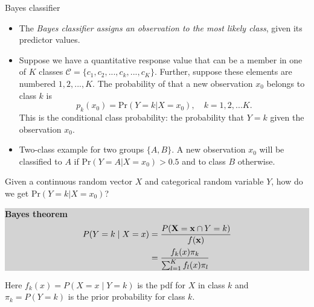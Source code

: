 \documentclass[10pt,ignorenonframetext,]{beamer}
\begin{document}
\begin{frame}

\begin{block}{Bayes classifier}

\begin{itemize}
\item
  The \emph{Bayes classifier assigns an observation to the most likely
  class}, given its predictor values.
\item
  Suppose we have a quantitative response value that can be a member in
  one of \(K\) classes
  \(\mathcal{C} = \{c_1, c_2, ..., c_k, ..., c_K\}\). Further, suppose
  these elements are numbered \(1, 2, ..., K\). The probability of that
  a new observation \(x_0\) belongs to class \(k\) is
  \[p_k(x_0) = \text{Pr}(Y=k | X=x_0), \quad k = 1, 2, ... K.\] This is
  the conditional class probability: the probability that \(Y=k\) given
  the observation \(x_0\).
\item
  Two-class example for two groups \(\{A, B\}\). A new observation
  \(x_0\) will be classified to \(A\) if
  \(\text{Pr}(Y=A | X=x_0) > 0.5\) and to class \(B\) otherwise.
\end{itemize}

\end{block}

\end{frame}

\begin{frame}

Given a continuous random vector \(X\) and categorical random variable
\(Y\), how do we get \(\text{Pr}(Y=k | X=x_0)\)?

\begin{center}
\colorbox{lightgray}{\begin{minipage}{10cm}
{\bf Bayes theorem}
\begin{align*}
P(Y=k \mid X= x) &= 
\frac{P({\bf X}={\bf x} \cap Y=k)}{f({\bf x})}\\
&= \frac{ f_k(x) \pi_k}{\sum_{l=1}^K  f_l(x) \pi_l}
\end{align*}
\end{minipage}}
\end{center}

Here \(f_k(x) = P(X=x \mid Y=k)\) is the pdf for \(X\) in class \(k\)
and \(\pi_k = P(Y=k)\) is the prior probability for class \(k\).

\end{frame}
\end{document}
